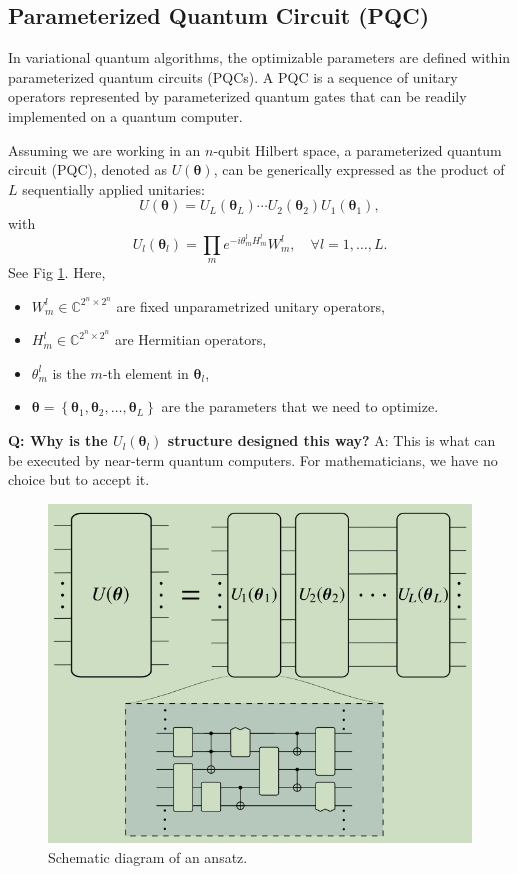 \documentclass[
        11pt, %
	a4paper, %
]{LegrandOrangeBook}
\begin{document}
\subsection{Parameterized Quantum Circuit (PQC) \cite{cerezo2021variational}}

In variational quantum algorithms, the optimizable parameters are defined within parameterized quantum circuits (PQCs). A PQC is a sequence of unitary operators represented by parameterized quantum gates that can be readily implemented on a quantum computer. 

Assuming we are working in an $n$-qubit Hilbert space, a parameterized quantum circuit (PQC), denoted as $U(\boldsymbol{\theta})$, can be generically expressed as the product of $L$ sequentially applied unitaries:
\begin{equation}
    U(\boldsymbol{\theta})=U_L\left(\boldsymbol{\theta}_L\right) \cdots U_2\left(\boldsymbol{\theta}_2\right) U_1\left(\boldsymbol{\theta}_1\right),
\end{equation}
with
\begin{equation}
    U_l\left(\boldsymbol{\theta}_l\right)=\prod_m e^{-i \theta_m^{l} H_m^{l}} W_m^{l}, \quad \forall l =1, \dots,L.
\end{equation}
See Fig \ref{fig:pqc}. Here, 
\begin{itemize}
    \item $W_m^{l} \in \mathbb{C}^{2^n \times 2^n}$ are fixed unparametrized unitary operators,
    \item $H_m^{l} \in \mathbb{C}^{2^n \times 2^n}$ are Hermitian operators,
    \item $\theta_m^{l}$ is the $m$-th element in $\boldsymbol{\theta}_l$,
    \item $\boldsymbol{\theta}=\left\{\boldsymbol{\theta}_1, \boldsymbol{\theta}_2, \ldots, \boldsymbol{\theta}_L \right\}$ are the parameters that we need to optimize.
\end{itemize}

\textbf{Q: Why is the $U_l\left(\boldsymbol{\theta}_l\right)$ structure designed this way? }
A: This is what can be executed by near-term quantum computers. For mathematicians, we have no choice but to accept it.

\begin{figure}
    \centering
    \includegraphics[width=0.75\linewidth]{Images/ansatz.png}
    \caption{Schematic diagram of an ansatz.}
    \label{fig:pqc}
\end{figure}
\end{document}
